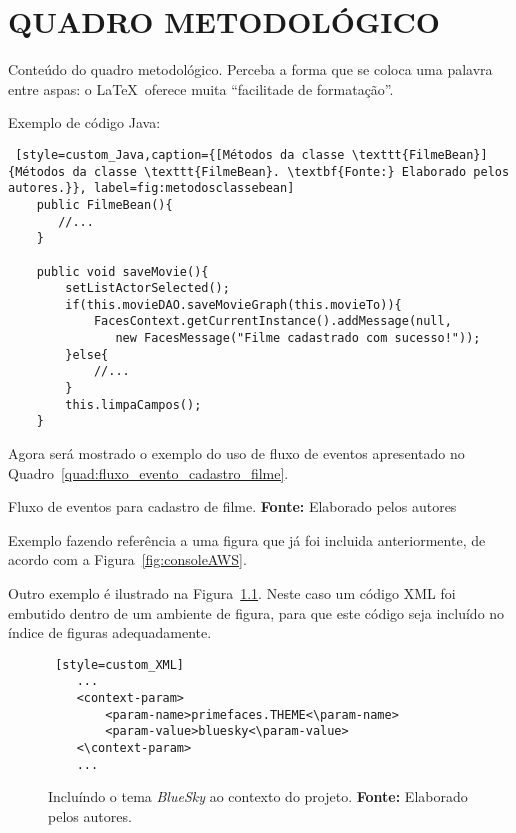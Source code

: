 
\chapter{QUADRO METODOLÓGICO}
\label{cap:quadroMetodologico}

\par Conteúdo do quadro metodológico. Perceba a forma que se coloca uma palavra entre aspas: o \LaTeX~oferece muita ``facilitade de formatação''.

Exemplo de código Java:

\begin{lstlisting} [style=custom_Java,caption={[Métodos da classe \texttt{FilmeBean}]{Métodos da classe \texttt{FilmeBean}. \textbf{Fonte:} Elaborado pelos autores.}}, label=fig:metodosclassebean] 	
	public FilmeBean(){  
       //...
   	}	
   	
	public void saveMovie(){
		setListActorSelected();		
		if(this.movieDAO.saveMovieGraph(this.movieTo)){
			FacesContext.getCurrentInstance().addMessage(null, 
			   new FacesMessage("Filme cadastrado com sucesso!")); 
		}else{
			//...
		}		
		this.limpaCampos();
	}
\end{lstlisting}

\par Agora será mostrado o exemplo do uso de fluxo de eventos apresentado no Quadro~\ref{quad:fluxo_evento_cadastro_filme}.

\begin{quadro}[h!]
  
  \caption[Fluxo de eventos para cadastro de filme]
           {Fluxo de eventos para cadastro de filme. \textbf{Fonte:} Elaborado pelos autores}
  \label{quad:fluxo_evento_cadastro_filme}
\end{quadro}

\par Exemplo fazendo referência a uma figura que já foi incluida anteriormente, de acordo com a Figura~\ref{fig:consoleAWS}.

\par Outro exemplo é ilustrado na Figura~\ref{fig:bluesky}. Neste caso um código XML foi embutido dentro de um ambiente de figura, para que este código seja incluído no índice de figuras adequadamente.
 
\begin{figure}[ht!]
  \begin{lstlisting} [style=custom_XML]
	...
	<context-param>
		<param-name>primefaces.THEME<\param-name>
		<param-value>bluesky<\param-value>
	<\context-param>
	...
  \end{lstlisting}
  \caption[Incluindo o tema \textit{BlueSky} ao contexto do projeto]
          {Incluíndo o tema \textit{BlueSky} ao contexto do projeto. \textbf{Fonte:} Elaborado pelos autores.}
  \label{fig:bluesky}
\end{figure}
